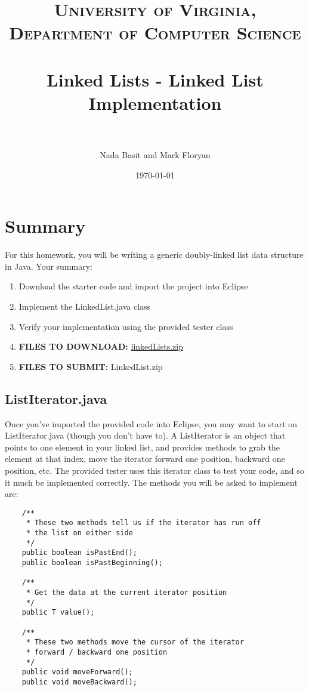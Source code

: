 \documentclass[paper=a4, fontsize=11pt, parskip=full]{scrartcl} %
\title{
\normalfont \normalsize
\textsc{University of Virginia, Department of Computer Science} \\ [25pt] %
\horrule{0.5pt} \\[0.4cm] %
\huge Linked Lists - Linked List Implementation \\ %
\horrule{2pt} \\[0.5cm] %
}
\author{Nada Basit and Mark Floryan}
\date{\normalsize\today} %
\numberwithin{equation}{section} %
\numberwithin{figure}{section} %
\numberwithin{table}{section} %
\begin{document}
\maketitle %


\section{Summary}

For this homework, you will be writing a generic doubly-linked list data structure in Java. Your summary:

\begin{enumerate}
	\item Download the starter code and import the project into Eclipse
	\item Implement the LinkedList.java class
	\item Verify your implementation using the provided tester class
	\item \textbf{FILES TO DOWNLOAD:} \href{https://uva-cs.github.io/dsa1/homeworks/LinkedLists/code/linkedlists.zip}{linkedLists.zip}
	\item \textbf{FILES TO SUBMIT:} LinkedList.zip
\end{enumerate}


\subsection{ListIterator.java}

Once you've imported the provided code into Eclipse, you may want to start on ListIterator.java (though you don't have to). A ListIterator is an object that points to one element in your linked list, and provides methods to grab the element at that index, move the iterator forward one position, backward one position, etc. The provided tester uses this iterator class to test your code, and so it much be implemented correctly. The methods you will be asked to implement are:

\begin{lstlisting}
	/**
	 * These two methods tell us if the iterator has run off
	 * the list on either side
	 */
	public boolean isPastEnd();
	public boolean isPastBeginning();

	/**
	 * Get the data at the current iterator position
	 */
	public T value();

	/**
	 * These two methods move the cursor of the iterator
	 * forward / backward one position
	 */
	public void moveForward();
	public void moveBackward();
\end{lstlisting}
\end{document}
